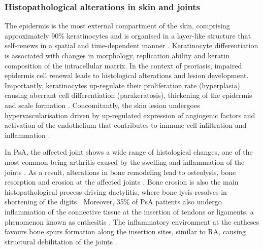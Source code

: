 

\subsubsection*{Histopathological alterations in skin and joints}

The epidermis is the most external compartment of the skin, comprising approximately 90\% keratinocytes  and is organised in a layer-like structure that self-renews in a spatial and time-dependent manner \parencite{Wikramanayake2014}. Keratinocyte differentiation is associated with changes in morphology, replication ability and keratin composition of the intracellular matrix. In the context of psoriasis, impaired epidermis cell renewal leads to histological alterations and lesion development. Importantly,  keratinocytes up-regulate their proliferation rate (hyperplasia) causing aberrant cell differentiation (parakeratosis), thickening of the epidermis and scale formation \parencite{Ruchusatsawat2011}. Concomitantly, the skin lesion undergoes hypervascularisation driven by up-regulated expression of angiogenic factors and activation of the endothelium that contributes to immune cell infiltration and inflammation \parencite{Perera2012}.  

In PsA, the affected joint shows a wide range of histological changes, one of the most common being arthritis caused by the swelling and inflammation of the joints \parencite{Haddad2013,Schett2011}. As a result, alterations in bone remodeling lead to osteolysis, bone resorption and erosion at the affected joints \parencite{Mensah2008}. Bone erosion is also the main histopathological process driving dactylitis, where bone lysis resolves in shortening of the digits \parencite{Gladman2005}. Moreover, 35\% of PsA patients also undergo inflammation of the connective tissue at the insertion of tendons or ligaments, a phenomenon known as enthesitis \parencite{McGonagle2011,Polachek2017}. The inflammatory environment at the entheses favours bone spurs formation along the insertion sites, similar to RA, causing structural debilitation of the joints \parencite{Benjamin2009,Finzel2014}.



